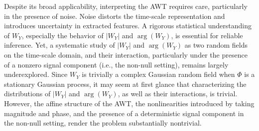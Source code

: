 \documentclass{amsart}
\begin{document}
Despite its broad applicability, interpreting the AWT requires care, particularly in the presence of noise. Noise distorts the time-scale representation and introduces uncertainty in extracted features. A rigorous statistical understanding of $W_Y$, especially the behavior of $|W_{Y}|$ and $\arg(W_{Y})$, is essential for reliable inference.
%
Yet, a systematic study of $|W_{Y}|$ and $\arg(W_{Y})$ as two random fields on the time-scale domain, and their interaction, particularly under the presence of a nonzero signal component (i.e., the non-null setting), remains largely underexplored.
%
Since $W_Y$ is trivially a complex Gaussian random field when $\Phi$ is a stationary Gaussian process, it may seem at first glance that characterizing the distributions of $|W_{Y}|$ and $\arg(W_{Y})$, as well as their interactions, is trivial. However, the affine structure of the AWT, the nonlinearities introduced by taking magnitude and phase, and the presence of a deterministic signal component in the non-null setting, render the problem substantially nontrivial.
\end{document}
